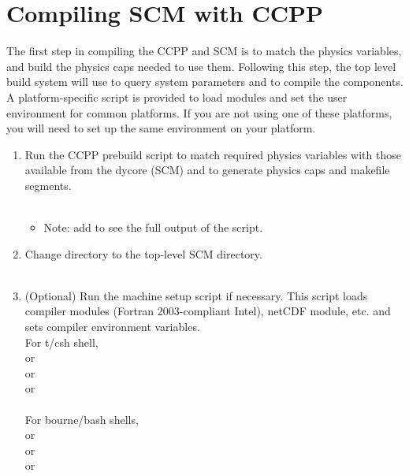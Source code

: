 \section{Compiling SCM with CCPP}

The first step in compiling the CCPP and SCM is to match the physics variables, and build the physics caps needed to use them.  Following this step, the top level build system will use  to query system parameters and  to compile the components.  A platform-specific script is provided to load modules and set the user environment for common platforms.  If you are not using one of these platforms, you will need to set up the same environment on your platform.

\begin{enumerate}
	\item Run the CCPP prebuild script to match required physics variables with those available from the dycore (SCM) and to generate physics caps and makefile segments.\\
  		\\
  		\begin{itemize}
  			\item Note: add  to see the full output of the script.\\
		\end{itemize}

	\item Change directory to the top-level SCM directory.\\
  		 \\
	\item (Optional) Run the machine setup script if necessary. This script loads compiler modules (Fortran 2003-compliant Intel), netCDF module, etc. and sets compiler environment variables.  \\
For t/csh shell, \\
  		 or\\
 		 or\\
		 or\\
		\\

For bourne/bash shells,\\
   or\\
   or\\
   or\\
  \\
  

\end{enumerate}
